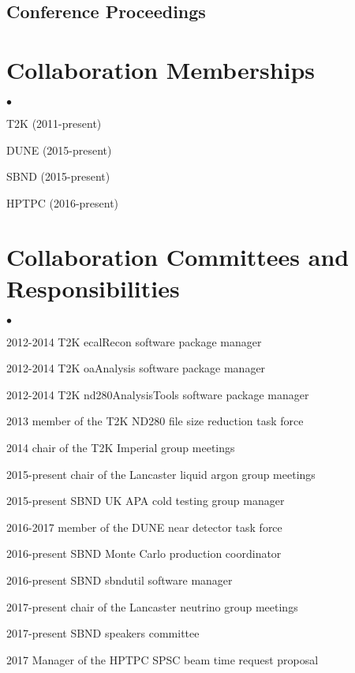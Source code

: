 \documentclass[margin,line]{res}
\newenvironment{list2}{
  \begin{list}{$\bullet$}{%
      \setlength{\itemsep}{0in}
      \setlength{\parsep}{0in} \setlength{\parskip}{0in}
      \setlength{\topsep}{0in} \setlength{\partopsep}{0in} 
      \setlength{\leftmargin}{0.2in}}}{\end{list}}
\begin{document}
\begin{resume}
\begin{refsection}[proceedings]
\section{\sc Conference Proceedings}
\nocite{*}
\printbibliography
\end{refsection}



\section{\sc Collaboration Memberships} 
\begin{list2}
\item T2K (2011-present)
\item DUNE (2015-present)
\item SBND (2015-present)
\item HPTPC (2016-present)
\end{list2}

\section{\sc Collaboration Committees and Responsibilities} 
\begin{list2}
\item 2012-2014 T2K ecalRecon software package manager
\item 2012-2014 T2K oaAnalysis software package manager
\item 2012-2014 T2K nd280AnalysisTools software package manager
\item 2013 member of the T2K ND280 file size reduction task force
\item 2014 chair of the T2K Imperial group meetings
\item 2015-present chair of the Lancaster liquid argon group meetings
\item 2015-present SBND UK APA cold testing group manager
\item 2016-2017 member of the DUNE near detector task force
\item 2016-present SBND Monte Carlo production coordinator
\item 2016-present SBND sbndutil software manager
\item 2017-present chair of the Lancaster neutrino group meetings
\item 2017-present SBND speakers committee 
\item 2017 Manager of the HPTPC SPSC beam time request proposal
\end{list2}


\end{resume}
\end{document}
